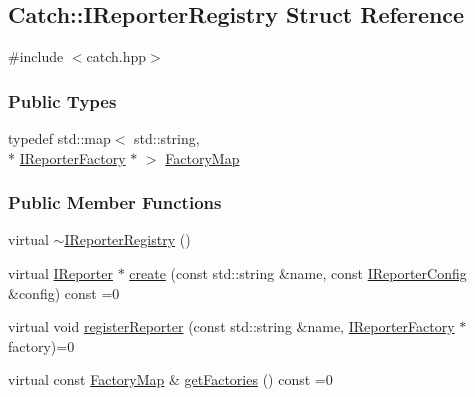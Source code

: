 \hypertarget{structCatch_1_1IReporterRegistry}{\subsection{Catch\-:\-:I\-Reporter\-Registry Struct Reference}
\label{structCatch_1_1IReporterRegistry}
}


{\ttfamily \#include $<$catch.\-hpp$>$}

\subsubsection*{Public Types}
\begin{DoxyCompactItemize}
\item 
typedef std\-::map$<$ std\-::string, \\*
\hyperlink{structCatch_1_1IReporterFactory}{I\-Reporter\-Factory} $\ast$ $>$ \hyperlink{structCatch_1_1IReporterRegistry_a328440adc2303a1e31bdc763f0504452}{Factory\-Map}
\end{DoxyCompactItemize}
\subsubsection*{Public Member Functions}
\begin{DoxyCompactItemize}
\item 
virtual \hyperlink{structCatch_1_1IReporterRegistry_a6f71b633176df8f005876e54db0b1ac9}{$\sim$\-I\-Reporter\-Registry} ()
\item 
virtual \hyperlink{structCatch_1_1IReporter}{I\-Reporter} $\ast$ \hyperlink{structCatch_1_1IReporterRegistry_a68525958fb5ce3aa3c7f974191a71686}{create} (const std\-::string \&name, const \hyperlink{structCatch_1_1IReporterConfig}{I\-Reporter\-Config} \&config) const =0
\item 
virtual void \hyperlink{structCatch_1_1IReporterRegistry_a9da0e7dbe81135536734962809e3cacf}{register\-Reporter} (const std\-::string \&name, \hyperlink{structCatch_1_1IReporterFactory}{I\-Reporter\-Factory} $\ast$factory)=0
\item 
virtual const \hyperlink{structCatch_1_1IReporterRegistry_a328440adc2303a1e31bdc763f0504452}{Factory\-Map} \& \hyperlink{structCatch_1_1IReporterRegistry_a8ee40835aa4a8c2810754f2074dec982}{get\-Factories} () const =0
\end{DoxyCompactItemize}


